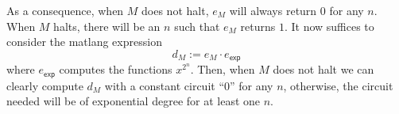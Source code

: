 As a consequence, when $M$ does not halt, $e_M$ will always return $0$
for any $n$. When $M$ halts, there will be an $n$ such that $e_M$ returns $1$.
It now suffices to consider the matlang expression
$$
d_M:=e_M\cdot e_{\mathsf{exp}}
$$
where $e_{\mathsf{exp}}$ computes the functions $x^{2^n}$. 
Then, when $M$ does not halt we can clearly compute $d_M$ with a constant circuit ``0''
for any $n$, otherwise, the circuit needed will be of exponential degree
for at least one $n$. 



%
%
%
